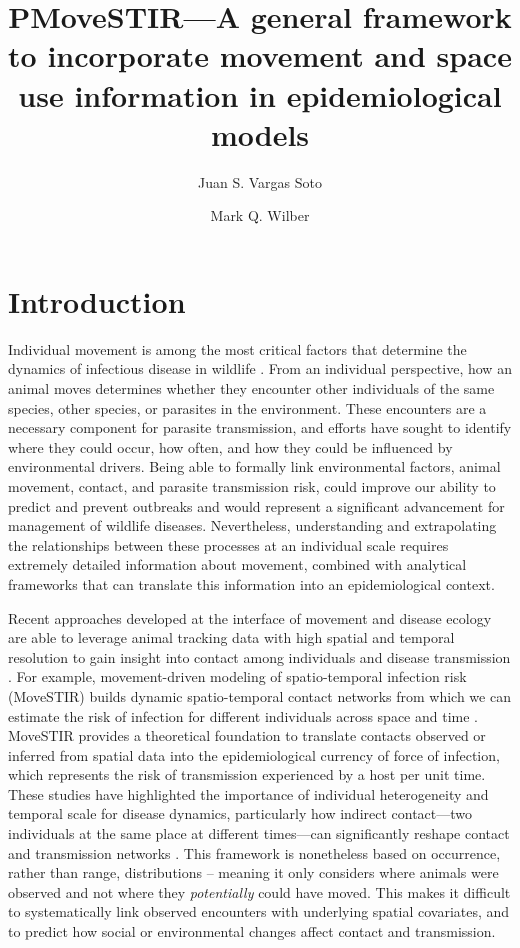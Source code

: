 \documentclass[letterpaper]{article}
\title{PMoveSTIR---A general framework to incorporate movement and space use information in epidemiological models}
\author{Juan S. Vargas Soto \and Mark Q. Wilber}
\affil{School of Natural Resources, University of Tennessee, Knoxville, TN}
\date{}
\begin{document}
\maketitle

\section*{Introduction}

Individual movement is among the most critical factors that determine the dynamics of infectious disease in wildlife \citep{Manlove2022,Dougherty2022}. 
From an individual perspective, how an animal moves determines whether they encounter other individuals of the same species, other species, or parasites in the environment. 
These encounters are a necessary component for parasite transmission, and efforts have sought to identify where they could occur, how often, and how they could be influenced by environmental drivers. 
Being able to formally link environmental factors, animal movement, contact, and parasite transmission risk, could improve our ability to predict and prevent outbreaks and would represent a significant advancement for management of wildlife diseases.  
Nevertheless, understanding and extrapolating the relationships between these processes at an individual scale requires extremely detailed information about movement, combined with analytical frameworks that can translate this information into an epidemiological context.

Recent approaches developed at the interface of movement and disease ecology are able to leverage animal tracking data with high spatial and temporal resolution to gain insight into contact among individuals and disease transmission \citep{Wilber2022,Yang2023}. For example, movement-driven modeling of spatio-temporal infection risk (MoveSTIR) builds dynamic spatio-temporal contact networks from which we can estimate the risk of infection for different individuals across space and time \citep{Wilber2022}. MoveSTIR provides a theoretical foundation to translate contacts observed or inferred from spatial data into the epidemiological currency of force of infection, which represents the risk of transmission experienced by a host per unit time. These studies have highlighted the importance of individual heterogeneity and temporal scale for disease dynamics, particularly how indirect contact---two individuals at the same place at different times---can significantly reshape contact and transmission networks \citep{Wilber2022,Yang2023}. This framework is nonetheless based on occurrence, rather than range, distributions \citep[in the terminology of ][]{Alston2022} -- meaning it only considers where animals were observed and not where they \emph{potentially} could have moved. This makes it difficult to systematically link observed encounters with underlying spatial covariates, and to predict how social or environmental changes affect contact and transmission. 
\end{document}
